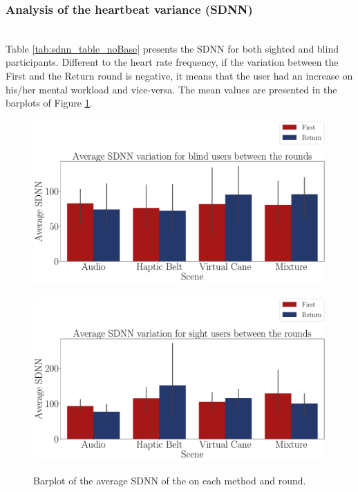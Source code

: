 \subsubsection*{Analysis of the heartbeat variance (SDNN)}\mbox{}\\
%

Table \ref{tab:sdnn_table_noBase} presents the SDNN for both sighted and blind participants. Different to the heart rate frequency, if the variation between the First and the Return round is negative, it means that the user had an increase on his/her mental workload and vice-versa. The mean values are presented in the barplots of Figure \ref{fig:barplot_ecg_sdnn_4_scene_blind_sight}.



\begin{figure}[!htpb]
    \centering
    \begin{minipage}{\textwidth}
        \centering
        \includegraphics[width = \textwidth]{Resultados/ECG/Figuras/pdf/barplot_ecg_sdnn_4_scene_blind.pdf}
        \label{fig:barplot_ecg_sdnn_4_scene_blind}
    \end{minipage}
    \begin{minipage}{\textwidth}
        \centering
        \includegraphics[width = \textwidth]{Resultados/ECG/Figuras/pdf/barplot_ecg_sdnn_4_scene_sight.pdf}
        \label{fig:barplot_ecg_sdnn_4_scene_sight}
    \end{minipage}
    \caption{Barplot of the average SDNN of the on each method and round.}
    \label{fig:barplot_ecg_sdnn_4_scene_blind_sight}
\end{figure}
